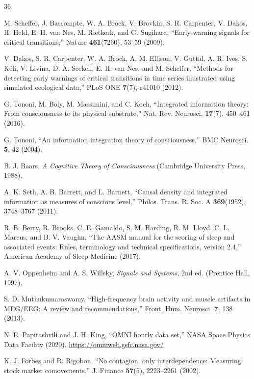 \documentclass[aip,cha,reprint,amsmath,amssymb,final,floatfix]{revtex4-2}
\begin{document}
\begin{thebibliography}{36}

 M. Scheffer, J. Bascompte, W. A. Brock, V. Brovkin, S. R. Carpenter, V. Dakos, H. Held, E. H. van Nes, M. Rietkerk, and G. Sugihara, ``Early-warning signals for critical transitions,'' Nature \textbf{461}(7260), 53--59 (2009).

 V. Dakos, S. R. Carpenter, W. A. Brock, A. M. Ellison, V. Guttal, A. R. Ives, S. K{\'e}fi, V. Livina, D. A. Seekell, E. H. van Nes, and M. Scheffer, ``Methods for detecting early warnings of critical transitions in time series illustrated using simulated ecological data,'' PLoS ONE \textbf{7}(7), e41010 (2012).

 G. Tononi, M. Boly, M. Massimini, and C. Koch, ``Integrated information theory: From consciousness to its physical substrate,'' Nat. Rev. Neurosci. \textbf{17}(7), 450--461 (2016).

 G. Tononi, ``An information integration theory of consciousness,'' BMC Neurosci. \textbf{5}, 42 (2004).

 B. J. Baars, \emph{A Cognitive Theory of Consciousness} (Cambridge University Press, 1988).

 A. K. Seth, A. B. Barrett, and L. Barnett, ``Causal density and integrated information as measures of conscious level,'' Philos. Trans. R. Soc. A \textbf{369}(1952), 3748--3767 (2011).

 R. B. Berry, R. Brooks, C. E. Gamaldo, S. M. Harding, R. M. Lloyd, C. L. Marcus, and B. V. Vaughn, ``The AASM manual for the scoring of sleep and associated events: Rules, terminology and technical specifications, version 2.4,'' American Academy of Sleep Medicine (2017).

 A. V. Oppenheim and A. S. Willsky, \emph{Signals and Systems}, 2nd ed. (Prentice Hall, 1997).

 S. D. Muthukumaraswamy, ``High-frequency brain activity and muscle artifacts in MEG/EEG: A review and recommendations,'' Front. Hum. Neurosci. \textbf{7}, 138 (2013).

 N. E. Papitashvili and J. H. King, ``OMNI hourly data set,'' NASA Space Physics Data Facility (2020). \url{https://omniweb.gsfc.nasa.gov/}

 K. J. Forbes and R. Rigobon, ``No contagion, only interdependence: Measuring stock market comovements,'' J. Finance \textbf{57}(5), 2223--2261 (2002).


\end{thebibliography}
\end{document}
